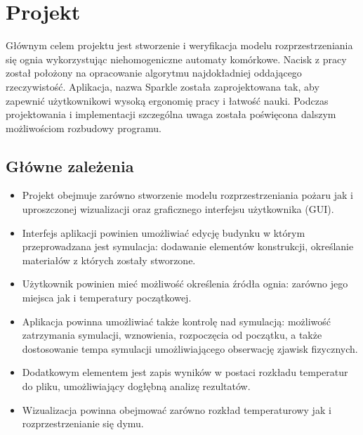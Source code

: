 \chapter {Projekt}
Głównym celem projektu jest stworzenie i weryfikacja modelu rozprzestrzeniania się ognia wykorzystując niehomogeniczne automaty
komórkowe. Nacisk z pracy został położony na opracowanie algorytmu najdokładniej oddającego rzeczywistość.
Aplikacja, nazwa Sparkle została zaprojektowana tak, aby zapewnić użytkownikowi wysoką ergonomię pracy i łatwość nauki.
Podczas projektowania i implementacji szczególna uwaga została poświęcona dalszym możliwościom rozbudowy programu.
\label{cha:projekt}
\section {Główne zależenia}
\begin {itemize}
\item Projekt obejmuje zarówno stworzenie modelu rozprzestrzeniania pożaru jak i  uproszczonej wizualizacji oraz graficznego interfejsu użytkownika (GUI).
\item Interfejs aplikacji powinien umożliwiać edycję budynku w którym przeprowadzana jest symulacja: dodawanie elementów konstrukcji, 
określanie materiałów z których zostały stworzone. 
\item Użytkownik powinien mieć możliwość określenia źródła ognia: zarówno jego miejsca jak i temperatury początkowej.
\item Aplikacja powinna umożliwiać także kontrolę nad symulacją: możliwość zatrzymania symulacji, wznowienia, rozpoczęcia od początku,
a także dostosowanie tempa symulacji umożliwiającego obserwację zjawisk fizycznych.
\item Dodatkowym elementem jest zapis wyników w postaci rozkładu temperatur do pliku, umożliwiający dogłębną analizę rezultatów.
\item Wizualizacja powinna obejmować zarówno rozkład temperaturowy jak i rozprzestrzenianie się dymu. 
\end {itemize}
